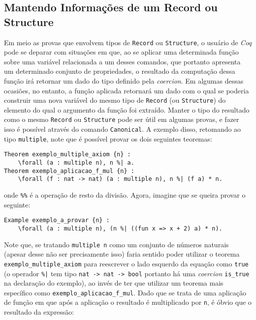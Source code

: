 {{%


\subsection{Mantendo Informações de um Record ou Structure}

Em meio as provas que envolvem tipos de \lstinline[language = coq]$Record$ ou \lstinline[language = coq]$Structure$, o usuário de \textit{Coq} pode se deparar com situações em que, ao se aplicar uma determinada função sobre uma variável relacionada a um desses comandos, que portanto apresenta um determinado conjunto de propriedades, o resultado da computação dessa função irá retornar um dado do tipo definido pela \textit{coercion}. Em algumas dessas ocasiões, no entanto, a função aplicada retornará um dado com o qual se poderia construir uma nova variável do mesmo tipo de \lstinline[language = coq]$Record$ (ou \lstinline[language = coq]$Structure$) do elemento do qual o argumento da função foi extraído. Manter o tipo do resultado como o mesmo \lstinline[language = coq]$Record$ ou \lstinline[language = coq]$Structure$ pode ser útil em algumas provas, e fazer isso é possível através do comando \lstinline[language = coq]$Canonical$. A exemplo disso, retomando ao tipo \lstinline[language = coq]$multiple$, note que é possível provar os dois seguintes teoremas:
    \begin{lstlisting}[language = coq,frame=single,tabsize=1]
Theorem exemplo_multiple_axiom {n} :
    \forall (a : multiple n), n %| a.
Theorem exemplo_aplicacao_f_mul {n} :
    \forall (f : nat -> nat) (a : multiple n), n %| (f a) * n.
    \end{lstlisting}
onde \lstinline[language = coq]$%%$ é a operação de resto da divisão. Agora, imagine que se queira provar o seguinte:
    \begin{lstlisting}[language = coq,frame=single,tabsize=1]
Example exemplo_a_provar {n} :
    \forall (a : multiple n), (n %| ((fun x => x + 2) a) * n).
    \end{lstlisting}
Note que, se tratando \lstinline[language = coq]!multiple n! como um conjunto de números naturais (apesar desse não ser precisamente isso) faria sentido poder utilizar o teorema \lstinline[language = coq]!exemplo_multiple_axiom! para reescrever o lado esquerdo da equação como \lstinline[language = coq]!true! (o operador  \lstinline[language = coq]!%|! tem tipo \lstinline[language = coq]!nat -> nat -> bool! portanto há uma \textit{coercion} \lstinline[language = coq]!is_true! na declaração do exemplo), ao invés de ter que utilizar um teorema mais específico como \lstinline[language = coq]!exemplo_aplicacao_f_mul!. Dado que se trata de uma aplicação de função em que após a aplicação o resultado é multiplicado por \lstinline[language = coq]!n!, é óbvio que o resultado da expressão:
}}
